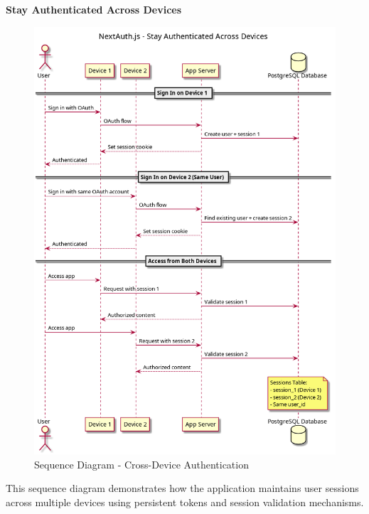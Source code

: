 \textbf{Stay Authenticated Across Devices}
\begin{figure}[H]
    \centering
    \includegraphics[width=1.0\textwidth]{conception/SprintII/sequence_diagrams/sequence_authentication_1_3_StayAuthenticatedAcrossDevices.png}
    \caption{Sequence Diagram - Cross-Device Authentication}
    \label{fig:seq_cross_device}
\end{figure}

This sequence diagram demonstrates how the application maintains user sessions across multiple devices using persistent tokens and session validation mechanisms.

